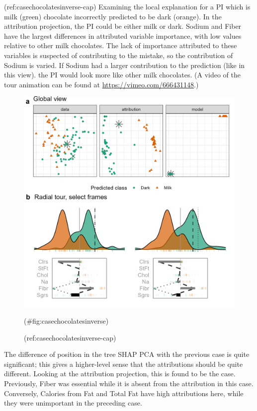 \documentclass[
]{jss}
\begin{document}
(ref:casechocolatesinverse-cap) Examining the local explanation for a PI which is milk (green) chocolate incorrectly predicted to be dark (orange). In the attribution projection, the PI could be either milk or dark. Sodium and Fiber have the largest differences in attributed variable importance, with low values relative to other milk chocolates. The lack of importance attributed to these variables is suspected of contributing to the mistake, so the contribution of Sodium is varied. If Sodium had a larger contribution to the prediction (like in this view). the PI would look more like other milk chocolates. (A video of the tour animation can be found at \url{https://vimeo.com/666431148}.)

\begin{CodeChunk}
\begin{figure}

{\centering \includegraphics[width=1\linewidth]{./figures/case_chocolates_inverse} 

}

\caption[(ref:casechocolatesinverse-cap)]{(ref:casechocolatesinverse-cap)}(\#fig:casechocolatesinverse)
\end{figure}
\end{CodeChunk}

The difference of position in the tree SHAP PCA with the previous case is quite significant; this gives a higher-level sense that the attributions should be quite different. Looking at the attribution projection, this is found to be the case. Previously, Fiber was essential while it is absent from the attribution in this case. Conversely, Calories from Fat and Total Fat have high attributions here, while they were unimportant in the preceding case.
\end{document}
